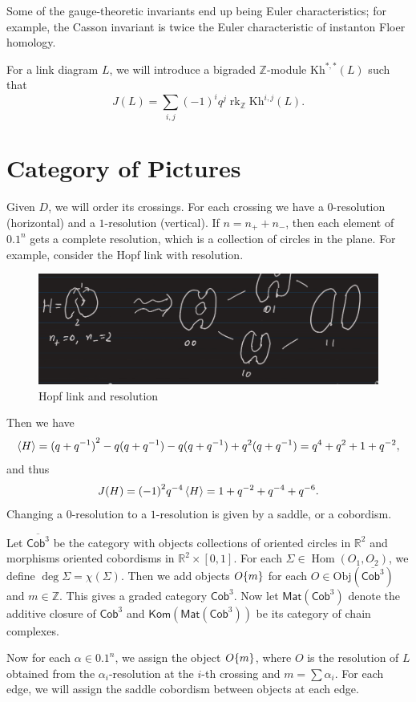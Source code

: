 \documentclass[leqno, openany]{memoir}
\theoremstyle{definition}
\theoremstyle{remark}
\theoremstyle{plain}
\theoremstyle{definition}
\theoremstyle{remark}
\newcommand{\R}{\mathbb{R}}
\newcommand{\Z}{\mathbb{Z}}
\newcommand{\mr}[1]{\mathrm{#1}}
\newcommand{\ms}[1]{\mathsf{#1}}
\newcommand{\ol}[1]{\overline{#1}}
\DeclareMathOperator{\Hom}{Hom}
\DeclareMathOperator{\rk}{rk}
\begin{document}
Some of the gauge-theoretic invariants end up being Euler characteristics; for example, the Casson invariant is twice the Euler characteristic of instanton Floer homology.

For a link diagram $L$, we will introduce a bigraded $\Z$-module $\mr{ Kh }^{*,*}(L)$ such that 
\[ J(L) = \sum_{i,j} {(-1)}^i q^j \rk_{\Z} \mr{ Kh }^{i,j}(L). \]

\section{Category of Pictures}%
\label{sec:category_of_pictures}

Given $D$, we will order its crossings. For each crossing we have a $0$-resolution (horizontal) and a $1$-resolution (vertical). If $n = n_+ + n_-$, then each element of $\qty{0,1}^n$ gets a complete resolution, which is a collection of circles in the plane. For example, consider the Hopf link with resolution. 

\begin{figure}[H]
    \centering
    \includegraphics[width=0.8\linewidth]{seb1.png}
    \caption{Hopf link and resolution}%
    \label{fig:seb1}
\end{figure}

Then we have
\[ \ev{H} = {(q+q^{-1})}^2 - q(q+q^{-1}) - q(q+q^{-1}) + q^2 (q+q^{-1}) = q^4 + q^2 + 1 + q^{-2}, \]
and thus 
\[ J(H) = {(-1)}^2 q^{-4} \ev{H} = 1 + q^{-2} + q^{-4} + q^{-6}. \]
Changing a $0$-resolution to a $1$-resolution is given by a saddle, or a cobordism.

Let $\ol{\ms{Cob}^3}$ be the category with objects collections of oriented circles in $\R^2$ and morphisms oriented cobordisms in $\R^2 \times [0,1]$. For each $\Sigma \in \Hom(O_1, O_2)$, we define $\deg \Sigma = \chi(\Sigma)$. Then we add objects $O\qty{m}$ for each $O \in \mr{Obj}(\ol{\ms{Cob}^3})$ and $m \in \Z$. This gives a graded category $\ms{Cob}^3$. Now let $\ms{Mat}(\ms{Cob}^3)$ denote the additive closure of $\ms{Cob}^3$ and $\ms{Kom}(\ms{Mat}(\ms{Cob}^3))$ be its category of chain complexes.

Now for each $\alpha \in \qty{0,1}^n$, we assign the object $O\qty{m}$, where $O$ is the resolution of $L$ obtained from the $\alpha_i$-resolution at the $i$-th crossing and $m = \sum \alpha_i$. For each edge, we will assign the saddle cobordism between objects at each edge.
\end{document}
